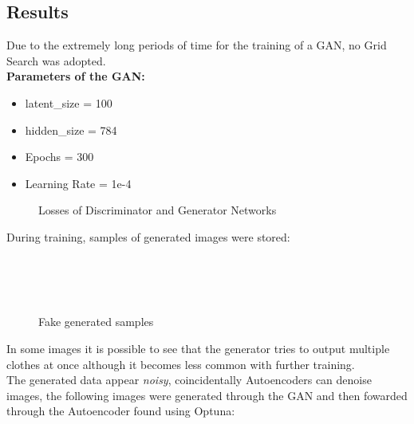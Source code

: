 \documentclass[11pt,a4paper,twocolumn]{IEEEtran}
\newcommand{\thinsepline}{\noindent\makebox[\linewidth]{\rule{7.5cm}{0.02pt}}}
\begin{document}
		\subsection{\textbf{Results}}
		Due to the extremely long periods of time for the training of a GAN, no Grid Search was adopted.
		\thinsepline\\
		\textbf{Parameters of the GAN:}
		\begin{itemize}
			\item latent\_size = 100
			\item hidden\_size = 784
			\item Epochs = 300
			\item Learning Rate = 1e-4
		\end{itemize}
		\thinsepline\newpage
		\begin{figure}[h]
			\centering
			
			\caption{Losses of Discriminator and Generator Networks}
			\label{fig:ganloss}
		\end{figure}
	During training, samples of generated images were stored:
	\begin{figure}[h]
		\centering
		\vspace*{-.7cm}\\
		\vspace*{-.7cm}\\
		\vspace*{-.5cm}\\
		\caption{Fake generated samples}
		\label{fig:ganimgs}
	\end{figure}
	In some images it is possible to see that the generator tries to output multiple clothes at once although it becomes less common with further training.\\
	The generated data appear \textit{noisy}, coincidentally Autoencoders can denoise images, the following images were generated through the GAN and then fowarded through the Autoencoder found using Optuna:
\end{document}
